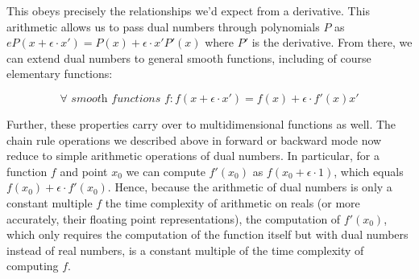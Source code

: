 \documentclass{article}
\begin{document}
This obeys precisely the relationships we'd expect from a derivative. This arithmetic allows us to pass dual numbers through polynomials $ P $ as $eP(x + \epsilon \cdot x') = P(x) + \epsilon \cdot x' P'(x) $ where $ P' $ is the derivative. From there, we can extend dual numbers to general smooth functions, including of course elementary functions:

    $$ \forall \textit{ smooth functions } f: f(x + \epsilon \cdot x') = f(x) + \epsilon \cdot f'(x) x' $$

Further, these properties carry over to multidimensional functions as well. The chain rule operations we described above in forward or backward mode now reduce to simple arithmetic operations of dual numbers. In particular, for a function $ f $ and point $ x_0 $ we can compute $ f'(x_0) $ as $ f(x_0 + \epsilon \cdot 1) $, which equals $ f(x_0) + \epsilon \cdot f'(x_0) $. Hence, because the arithmetic of dual numbers is only a constant multiple $ f $ the time complexity of arithmetic on reals (or more accurately, their floating point representations), the computation of $ f'(x_0) $, which only requires the computation of the function itself but with dual numbers instead of real numbers, is a constant multiple of the time complexity of computing $ f $.
\end{document}
